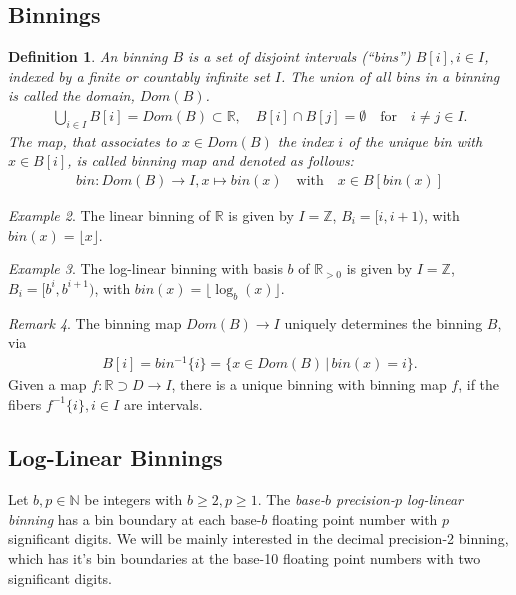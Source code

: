 \documentclass{article}
\theoremstyle{plain}
\newtheorem{definition}{Definition}[section]
\theoremstyle{remark}
\newtheorem{remark}[definition]{Remark}
\newtheorem{example}[definition]{Example}
\newcommand{\IN}{\mathbb{N}}
\newcommand{\IR}{\mathbb{R}}
\newcommand{\IZ}{\mathbb{Z}}
\newcommand{\Union}{\bigcup}
\newcommand{\defn}{\emph} %
\newcommand{\qtext}[1]{\quad\text{#1}\quad} %
\newcommand{\lra}{\longrightarrow}
\newcommand{\floor}[1]{\lfloor#1\rfloor}
\begin{document}
\subsection{Binnings}

\begin{definition}
  An binning $B$ is a set of disjoint intervals (``bins'') $B[i], i\in I$, indexed by a
  finite or countably infinite set $I$.
  The union of all bins in a binning is called the domain, $Dom(B)$.
  \begin{align*}
    \Union_{i \in I} B[i] = Dom(B) \subset \IR,\quad B[i] \cap B[j] = \emptyset \qtext{for} i \neq j \in I.
  \end{align*}
  The map, that associates to $x \in Dom(B)$ the index $i$ of the unique bin with $x \in B[i]$,
  is called \defn{binning map}
  and denoted as follows:
  \begin{align*}
    bin: Dom(B) \lra I, x \mapsto bin(x) \qtext{with} x \in B[bin(x)]
  \end{align*}
\end{definition}

\begin{example}
  The linear binning of $\IR$ is given by $I = \IZ$, $B_i = [i, i+1)$, with $bin(x)=\floor{x}$.
\end{example}

\begin{example}
  The log-linear binning with basis $b$ of $\IR_{>0}$ is given by $I=\IZ$, $B_i = [b^i, b^{i+1})$, with $bin(x)=\floor{\log_b(x)}$.
\end{example}

\begin{remark}
  The binning map $Dom(B) \lra I$ uniquely determines the binning $B$, via
  \begin{align*}
    B[i] = bin^{-1}\{ i \} = \{ x \in Dom(B) \,|\, bin(x) = i \}.
  \end{align*}
  Given a map $f:\IR \supset D \lra I$, there is a unique binning with binning map $f$, if the fibers $f^{-1}\{i\}, i \in I$ are intervals.
\end{remark}

\subsection{Log-Linear Binnings}
\newcommand{\float}{\mathrm{float}}
\newcommand{\bin}{\mathrm{bin}}

Let $b,p \in \IN$ be integers with $b\geq 2, p \geq 1$.
The \defn{base-$b$ precision-$p$ log-linear binning} has a bin boundary at each base-$b$ floating point number with $p$ significant digits.
We will be mainly interested in the decimal precision-2 binning, which has it's bin boundaries at the base-10 floating point numbers with two significant digits.
\end{document}
